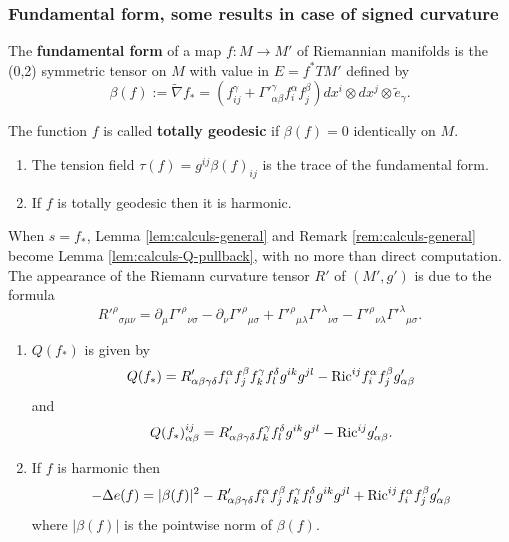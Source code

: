 \subsubsection{Fundamental form, some results in case of signed curvature}
\label{sec:org805e540}

\begin{definition}
The \textbf{fundamental form} of a map \(f: M \longrightarrow M'\) of Riemannian manifolds is
the (0,2) symmetric tensor on \(M\) with value in \(E=f^* TM'\) defined by
\[
 \beta(f):= \tilde \nabla f_* = \left(f^\gamma_{ij} + \Gamma'^\gamma_{\alpha\beta}
f^\alpha_i f^\beta_j\right) dx^i\otimes dx^j\otimes \tilde e_\gamma.
\]

The function \(f\) is called \textbf{totally geodesic} if \(\beta(f) = 0\) identically on \(M\).
\end{definition}

\begin{remark}
\begin{enumerate}
\item The tension field \(\tau(f) = g^{ij} \beta(f)_{ij}\) is the trace of the
fundamental form.
\item If \(f\) is totally geodesic then it is harmonic.
\end{enumerate}
\end{remark}

When \(s = f_*\), Lemma \ref{lem:calculs-general} and Remark \ref{rem:calculs-general}
become Lemma \ref{lem:calculs-Q-pullback}, with no more than direct computation. The appearance of the Riemann curvature
tensor \(R'\) of \((M',g')\) is due to the formula
\[ R'^\rho{}_{\sigma\mu\nu} = \partial_\mu\Gamma'^\rho{}_{\nu\sigma} -
\partial_\nu\Gamma'^\rho{}_{\mu\sigma} +
\Gamma'^\rho{}_{\mu\lambda}\Gamma'^\lambda{}_{\nu\sigma} -
\Gamma'^\rho{}_{\nu\lambda}\Gamma'^\lambda{}_{\mu\sigma}. \]

\begin{lemma}
\label{lem:calculs-Q-pullback}
\begin{enumerate}
\item \(Q(f_*)\) is given by
\[
   Q(f_*) = R'_{\alpha\beta\gamma\delta} f^\alpha_i f^\beta_j f^\gamma_k f^\delta_l
   g^{ik}g^{jl} - {\rm Ric}^{ij}f_i^\alpha f^\beta_j g'_{\alpha\beta}
   \]
and
\[
   Q(f_*)_{\alpha\beta}^{ij} = R'_{\alpha\beta\gamma\delta}f^\gamma_k f^\delta_l g^{ik}g^{jl}
   -{\rm Ric}^{ij}g'_{\alpha\beta}.
   \]
\item If \(f\) is harmonic then 
\[
    -\Delta e(f) = |\beta(f)|^2 - R'_{\alpha\beta\gamma\delta} f^\alpha_i f^\beta_j f^\gamma_k f^\delta_l
   g^{ik}g^{jl} + {\rm Ric}^{ij}f_i^\alpha f^\beta_j g'_{\alpha\beta}
   \]
 where \(|\beta(f)|\) is the pointwise norm of \(\beta(f)\).
\end{enumerate}
\end{lemma}


